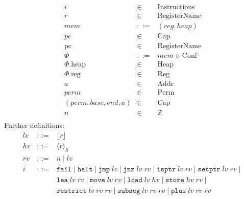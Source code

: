 \documentclass[a4paper]{article}
\newcommand{\var}[1]{\mathit{#1}}
\newcommand{\hv}{\var{hv}}
\newcommand{\rv}{\var{rv}}
\newcommand{\lv}{\var{lv}}
\newcommand{\pc}{\mathit{pc}}
\newcommand{\pcreg}{\mathrm{pc}}
\newcommand{\addr}{\var{a}}
\newcommand{\start}{\var{base}}
\newcommand{\addrend}{\var{end}}
\newcommand{\mem}{\var{mem}}
\newcommand{\reg}{\var{reg}}
\newcommand{\heap}{\var{heap}}
\newcommand{\perm}{\var{perm}}
\newcommand{\plainproj}[1]{\mathrm{#1}}
\newcommand{\memheap}[1][\Phi]{#1.\plainproj{heap}}
\newcommand{\memreg}[1][\Phi]{#1.\plainproj{reg}}
\newcommand{\plaindom}[1]{\mathrm{#1}}
\newcommand{\Caps}{\plaindom{Cap}}
\newcommand{\Addrs}{\plaindom{Addr}}
\newcommand{\RegName}{\plaindom{RegisterName}}
\newcommand{\Regs}{\plaindom{Reg}}
\newcommand{\Heaps}{\plaindom{Heap}}
\newcommand{\Confs}{\plaindom{Conf}}
\newcommand{\Instrs}{\plaindom{Instructions}}
\newcommand{\ints}{\mathbb{Z}}
\newcommand{\Perms}{\plaindom{Perm}}
\newcommand{\refreg}[1]{\lfloor #1 \rfloor}
\newcommand{\refheap}[1]{\langle #1 \rangle_h}
\newcommand{\zinstr}[1]{\mathtt{#1}}
\newcommand{\fail}{\zinstr{fail}}
\newcommand{\halt}{\zinstr{halt}}
\newcommand{\oneinstr}[2]{\zinstr{#1} \; #2}
\newcommand{\jmp}[1]{\oneinstr{jmp}{#1}}
\newcommand{\twoinstr}[3]{\zinstr{#1} \; #2 \; #3}
\newcommand{\jnz}[2]{\twoinstr{jnz}{#1}{#2}}
\newcommand{\isptr}[2]{\twoinstr{isptr}{#1}{#2}}
\newcommand{\setptr}[2]{\twoinstr{setptr}{#1}{#2}}
\newcommand{\move}[2]{\twoinstr{move}{#1}{#2}}
\newcommand{\store}[2]{\twoinstr{store}{#1}{#2}}
\newcommand{\load}[2]{\twoinstr{load}{#1}{#2}}
\newcommand{\lea}[2]{\twoinstr{lea}{#1}{#2}}
\newcommand{\threeinstr}[4]{\zinstr{#1} \; #2 \; #3 \; #4}
\newcommand{\restrict}[3]{\threeinstr{restrict}{#1}{#2}{#3}}
\newcommand{\subseg}[3]{\threeinstr{subseg}{#1}{#2}{#3}}
\newcommand{\plus}[3]{\threeinstr{plus}{#1}{#2}{#3}}
\begin{document}
$$\begin{array}{rcl}
i       &\in& \Instrs \\
r       &\in& \RegName\\
\mem    &::=& (\reg,\heap)\\
\pc     &\in& \Caps \\
\pcreg  &\in& \RegName \\
\Phi    &::=& \mem \in \Confs\\
\memheap&\in& \Heaps \\
\memreg &\in& \Regs \\
\addr   &\in& \Addrs\\
\perm   &\in& \Perms\\
(\perm,\start,\addrend,\addr) &\in& \Caps \\
n       &\in& \ints\\
\end{array}$$
Further definitions:
$$\begin{array}{rcl}
\lv    &::=& \refreg{r} \\
\hv    &::=& \refheap{r}\\
\rv    &::=& n \mid \lv \\
i      &::=& \fail \mid \halt \mid 
             \jmp{\lv} \mid \jnz{\lv}{\rv} \mid
             \isptr{\lv}{\rv} \mid \setptr{\lv}{\rv} \mid \\
       &   & \lea{\lv}{\rv} \mid\move{\lv}{\rv} \mid \load{\lv}{\hv} \mid \store{\hv}{\rv} \mid  \\
       &   & \restrict{\lv}{\rv}{\rv} \mid \subseg{\lv}{\rv}{\rv} \mid \plus{\lv}{\rv}{\rv}
\end{array}$$
\end{document}
